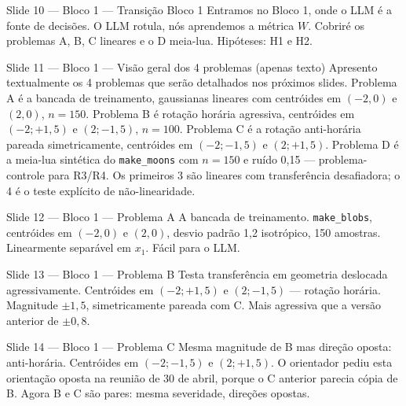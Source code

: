 \documentclass[aspectratio=169,10pt]{beamer}
\begin{document}
\begin{frame}{Slide 10 --- Bloco 1 --- Transi\c{c}\~ao Bloco 1}
\footnotesize
Entramos no Bloco 1, onde o LLM \'e a fonte de decis\~oes. O LLM rotula, n\'os aprendemos a m\'etrica $W$. Cobrir\'e os problemas A, B, C lineares e o D meia-lua. Hip\'oteses: H1 e H2.
\end{frame}

\begin{frame}{Slide 11 --- Bloco 1 --- Vis\~ao geral dos 4 problemas (apenas texto)}
\footnotesize
Apresento textualmente os 4 problemas que ser\~ao detalhados nos pr\'oximos slides. Problema A \'e a bancada de treinamento, gaussianas lineares com centr\'oides em $(-2, 0)$ e $(2, 0)$, $n=150$. Problema B \'e rota\c{c}\~ao hor\'aria agressiva, centr\'oides em $(-2; +1{,}5)$ e $(2; -1{,}5)$, $n=100$. Problema C \'e a rota\c{c}\~ao anti-hor\'aria pareada simetricamente, centr\'oides em $(-2; -1{,}5)$ e $(2; +1{,}5)$. Problema D \'e a meia-lua sint\'etica do \texttt{make\_moons} com $n=150$ e ru\'ido 0{,}15 --- problema-controle para R3/R4. Os primeiros 3 s\~ao lineares com transfer\^encia desafiadora; o 4\textordmasculine{} \'e o teste expl\'icito de n\~ao-linearidade.
\end{frame}

\begin{frame}{Slide 12 --- Bloco 1 --- Problema A}
\footnotesize
A bancada de treinamento. \texttt{make\_blobs}, centr\'oides em $(-2, 0)$ e $(2, 0)$, desvio padr\~ao 1{,}2 isotr\'opico, 150 amostras. Linearmente separ\'avel em $x_1$. F\'acil para o LLM.
\end{frame}

\begin{frame}{Slide 13 --- Bloco 1 --- Problema B}
\footnotesize
Testa transfer\^encia em geometria deslocada agressivamente. Centr\'oides em $(-2; +1{,}5)$ e $(2; -1{,}5)$ --- rota\c{c}\~ao hor\'aria. Magnitude $\pm 1{,}5$, simetricamente pareada com C. Mais agressiva que a vers\~ao anterior de $\pm 0{,}8$.
\end{frame}

\begin{frame}{Slide 14 --- Bloco 1 --- Problema C}
\footnotesize
Mesma magnitude de B mas dire\c{c}\~ao oposta: anti-hor\'aria. Centr\'oides em $(-2; -1{,}5)$ e $(2; +1{,}5)$. O orientador pediu esta orienta\c{c}\~ao oposta na reuni\~ao de 30 de abril, porque o C anterior parecia c\'opia de B. Agora B e C s\~ao pares: mesma severidade, dire\c{c}\~oes opostas.
\end{frame}
\end{document}

